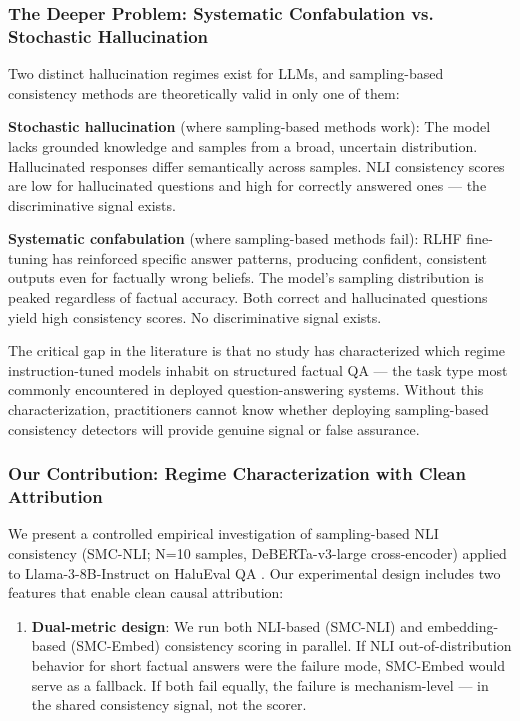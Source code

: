 \subsubsection{The Deeper Problem: Systematic Confabulation vs. Stochastic Hallucination}

Two distinct hallucination regimes exist for LLMs, and sampling-based consistency methods are theoretically valid in only one of them:

\textbf{Stochastic hallucination} (where sampling-based methods work): The model lacks grounded knowledge and samples from a broad, uncertain distribution. Hallucinated responses differ semantically across samples. NLI consistency scores are low for hallucinated questions and high for correctly answered ones --- the discriminative signal exists.

\textbf{Systematic confabulation} (where sampling-based methods fail): RLHF fine-tuning has reinforced specific answer patterns, producing confident, consistent outputs even for factually wrong beliefs. The model's sampling distribution is peaked regardless of factual accuracy. Both correct and hallucinated questions yield high consistency scores. No discriminative signal exists.

The critical gap in the literature is that no study has characterized which regime instruction-tuned models inhabit on structured factual QA --- the task type most commonly encountered in deployed question-answering systems. Without this characterization, practitioners cannot know whether deploying sampling-based consistency detectors will provide genuine signal or false assurance.

\subsubsection{Our Contribution: Regime Characterization with Clean Attribution}

We present a controlled empirical investigation of sampling-based NLI consistency (SMC-NLI; N=10 samples, DeBERTa-v3-large cross-encoder) applied to Llama-3-8B-Instruct on HaluEval QA \citep{Li2023HaluEval}. Our experimental design includes two features that enable clean causal attribution:

\begin{enumerate}
\item \textbf{Dual-metric design}: We run both NLI-based (SMC-NLI) and embedding-based (SMC-Embed) consistency scoring in parallel. If NLI out-of-distribution behavior for short factual answers were the failure mode, SMC-Embed would serve as a fallback. If both fail equally, the failure is mechanism-level --- in the shared consistency signal, not the scorer.
\end{enumerate}

